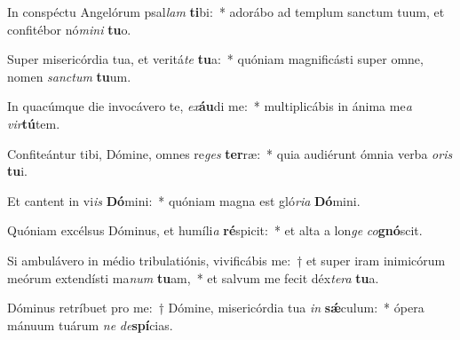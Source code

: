 \item In conspéctu Angelórum psal\textit{lam} \textbf{ti}bi:~* adorábo ad templum sanctum tuum, et confitébor nó\textit{mi}\textit{ni} \textbf{tu}o.
\item Super misericórdia tua, et veritá\textit{te} \textbf{tu}a:~* quóniam magnificásti super omne, nomen \textit{sanc}\textit{tum} \textbf{tu}um.
\item In quacúmque die invocávero te, \textit{ex}\textbf{áu}di me:~* multiplicábis in ánima me\textit{a} \textit{vir}\textbf{tú}tem.
\item Confiteántur tibi, Dómine, omnes re\textit{ges} \textbf{ter}ræ:~* quia audiérunt ómnia verba \textit{o}\textit{ris} \textbf{tu}i.
\item Et cantent in vi\textit{is} \textbf{Dó}mini:~* quóniam magna est gló\textit{ri}\textit{a} \textbf{Dó}mini.
\item Quóniam excélsus Dóminus, et humíli\textit{a} \textbf{ré}spicit:~* et alta a lon\textit{ge} \textit{co}\textbf{gnó}scit.
\item Si ambulávero in médio tribulatiónis, vivificábis me:~† et super iram inimicórum meórum extendísti ma\textit{num} \textbf{tu}am,~* et salvum me fecit déx\textit{te}\textit{ra} \textbf{tu}a.
\item Dóminus retríbuet pro me:~† Dómine, misericórdia tua \textit{in} \textbf{sǽ}culum:~* ópera mánuum tuárum \textit{ne} \textit{de}\textbf{spí}cias.

